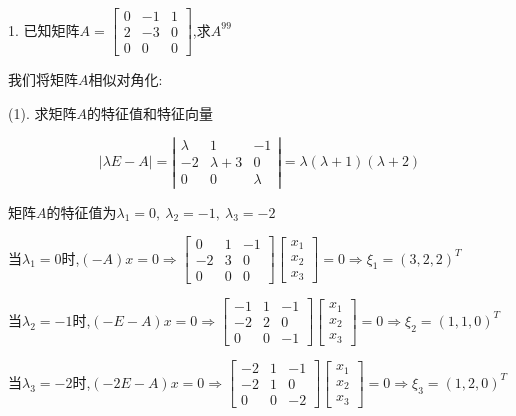 1. 已知矩阵$A=\left[ \begin{matrix}
	0&-1&1\\
	2&-3&0\\
	0&0&0
\end{matrix}\right] $,求$A^{99}$
\begin{solution}
	
	我们将矩阵$A$相似对角化: 
	
	(1). 求矩阵$A$的特征值和特征向量
	
	$$\left| \lambda E-A\right|=\left| \begin{matrix}
		\lambda&1&-1\\-2&\lambda+3&0\\
		0&0&\lambda
	\end{matrix}\right|=\lambda(\lambda+1)(\lambda+2)$$
	
	矩阵$A$的特征值为$\lambda_{1}=0,\ \lambda_{2}=-1,\ \lambda_{3}=-2$
	
	当$\lambda_{1}=0$时,$(-A)x=0\Rightarrow \left[ \begin{matrix}
		0&1&-1\\
		-2&3&0\\
		0&0&0
	\end{matrix}\right]\left[ \begin{matrix}
		x_{1}\\x_{2}\\x_{3}
	\end{matrix}\right]=0\Rightarrow \xi_{1}=(3,2,2)^T$
	
	当$\lambda_{2}=-1$时,$(-E-A)x=0\Rightarrow \left[ \begin{matrix}
		-1&1&-1\\
		-2&2&0\\
		0&0&-1
	\end{matrix}\right]\left[ \begin{matrix}
		x_{1}\\x_{2}\\x_{3}
	\end{matrix}\right]=0\Rightarrow \xi_{2}=(1,1,0)^T$
	
	当$\lambda_{3}=-2$时,$(-2E-A)x=0\Rightarrow \left[ \begin{matrix}
		-2&1&-1\\
		-2&1&0\\
		0&0&-2
	\end{matrix}\right]\left[ \begin{matrix}
		x_{1}\\x_{2}\\x_{3}
	\end{matrix}\right]=0\Rightarrow \xi_{3}=(1,2,0)^T$
	

\end{solution}
